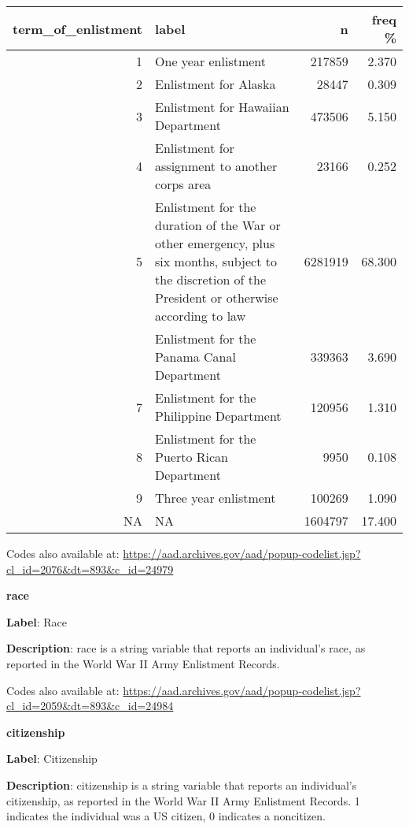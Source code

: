 \documentclass[
]{article}
\begin{document}
\begin{table}
\centering
\begin{tabular}{r>{\raggedright\arraybackslash}p{7cm}rr}
\toprule
term\_of\_enlistment & label & n & freq \%\\
\midrule
1 & One year enlistment & 217859 & 2.370\\
2 & Enlistment for Alaska & 28447 & 0.309\\
3 & Enlistment for Hawaiian Department & 473506 & 5.150\\
4 & Enlistment for assignment to another corps area & 23166 & 0.252\\
5 & Enlistment for the duration of the War or other emergency, plus six months, subject to the discretion of the President or otherwise according to law & 6281919 & 68.300\\
\addlinespace
6 & Enlistment for the Panama Canal Department & 339363 & 3.690\\
7 & Enlistment for the Philippine Department & 120956 & 1.310\\
8 & Enlistment for the Puerto Rican Department & 9950 & 0.108\\
9 & Three year enlistment & 100269 & 1.090\\
NA & NA & 1604797 & 17.400\\
\bottomrule
\end{tabular}
\end{table}

Codes also available at:
\url{https://aad.archives.gov/aad/popup-codelist.jsp?cl_id=2076\&dt=893\&c_id=24979}

\newpage

\textbf{\huge race} \normalsize \vspace{12pt}

\textbf{Label}: Race

\textbf{Description}: race is a string variable that reports an
individual's race, as reported in the World War II Army Enlistment
Records.

Codes also available at:
\url{https://aad.archives.gov/aad/popup-codelist.jsp?cl_id=2059\&dt=893\&c_id=24984}

\newpage

\textbf{\huge citizenship} \normalsize \vspace{12pt}

\textbf{Label}: Citizenship

\textbf{Description}: citizenship is a string variable that reports an
individual's citizenship, as reported in the World War II Army
Enlistment Records. 1 indicates the individual was a US citizen, 0
indicates a noncitizen.
\end{document}
